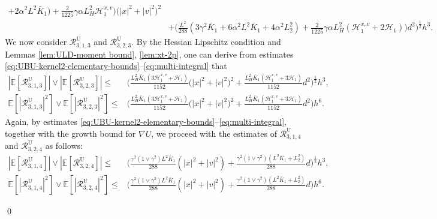 \documentclass[12pt]{article}
\newenvironment{redtext}
  {\color{black}\ignorespaces}
  {\ignorespacesafterend}
\numberwithin{equation}{section}
\renewenvironment{proof}%
  {\begin{trivlist}%
   \item[]\ignorespaces}%
  {\qed\end{trivlist}}
\newcommand{\E}{\mathbb{E}}
\begin{document}
\begin{redtext}
\begin{proof}
\begin{align}
+
2\alpha^2L^2\bar K_1
)
+
\tfrac{2}{1225}
\gamma\alpha L_H^2
\mathscr H_1^{x,v}
\big)
\big(
|x|^2+|v|^2
\big)^2
\nonumber
\\  &
+
\big(
\tfrac{L^2}{288}
(
3\gamma^2\bar K_1
+
6\alpha^2L^2\bar K_1
+
4\alpha^2L_2^2
)
+
\tfrac{2}{1225}
\gamma\alpha L_H^2
\left(
\mathscr H_1^{x,v}+2\mathscr H_1
\right)
\big)
d^2
\Big)^{\frac12}
h^3.
\label{eq:R-U-312-322-weak-bounds}
\end{align}
We now consider
$\mathcal R_{3,1,3}^{\mathrm U}$ and
$\mathcal R_{3,2,3}^{\mathrm U}$. By the Hessian Lipschitz condition and Lemmas \ref{lem:ULD-moment bound}, \ref{lem:xt-2p}, one can derive from estimates \eqref{eq:UBU-kernel2-elementary-bounds}--\eqref{eq:multi-integral} that  
\begin{align}
\left|
\E\left[
\mathcal R^{\mathrm U}_{3,1,3}
\right]
\right|
\vee
\left|
\E\left[
\mathcal R^{\mathrm U}_{3,2,3}
\right]
\right|
\leq  &
\Big(
\tfrac{L_H^2\bar K_1
(
3 \mathscr H_1^{x,v}+\mathscr H_1
)}{1152}
\big(
|x|^2+|v|^2
\big)^2
+
\tfrac{L_H^2\bar K_1
(
\mathscr H_1^{x,v}+3\mathscr H_1
)}{1152}
d^2
\Big)^{\frac12}
h^3,
\\ 
\E
\left[
\left|
\mathcal R^{\mathrm U}_{3,1,3}
\right|^2
\right]
\vee
\E
\left[
\left|
\mathcal R^{\mathrm U}_{3,2,3}
\right|^2
\right]
\leq &
\Big(
\tfrac{L_H^2\bar K_1
(
3 \mathscr H_1^{x,v}+\mathscr H_1
)}{1152}
\big(
|x|^2+|v|^2
\big)^2
+
\tfrac{L_H^2\bar K_1
(
\mathscr H_1^{x,v}+3\mathscr H_1
)}{1152}
d^2
\Big)h^6.
\label{eq:R-U-313-323-weak-bounds}
\end{align}
Again, by estimates \eqref{eq:UBU-kernel2-elementary-bounds}--\eqref{eq:multi-integral}, together with the growth bound for $\nabla U$, we proceed with the estimates of
$\mathcal R_{3,1,4}^{\mathrm U}$ and
$\mathcal R_{3,2,4}^{\mathrm U}$ as follows:
\begin{align}
\left|
\E\left[
\mathcal R^{\mathrm U}_{3,1,4}
\right]
\right|
\vee
\left|
\E\left[
\mathcal R^{\mathrm U}_{3,2,4}
\right]
\right|
\leq  &
\Big(
\tfrac{\gamma^2(1\vee\gamma^2)L^2\bar K_1}{288}
\left(
|x|^2+|v|^2
\right)
+
\tfrac{\gamma^2(1\vee\gamma^2)
\left(
L^2\bar K_1+L_2^2
\right)}{288}d
\Big)^{\frac12}
h^3,
\label{eq:R-U-314-324-weak-bounds}
\\  
\E
\left[
\left|
\mathcal R^{\mathrm U}_{3,1,4}
\right|^2
\right]
\vee
\E
\left[
\left|
\mathcal R^{\mathrm U}_{3,2,4}
\right|^2
\right]
\leq &
\Big(
\tfrac{\gamma^2(1\vee\gamma^2)L^2\bar K_1}{288}
\left(
|x|^2+|v|^2
\right)
+
\tfrac{\gamma^2(1\vee\gamma^2)
\left(
L^2\bar K_1+L_2^2
\right)}{288}d
\Big)
h^6.
\end{align}

\end{proof}
\end{redtext}
\end{document}
